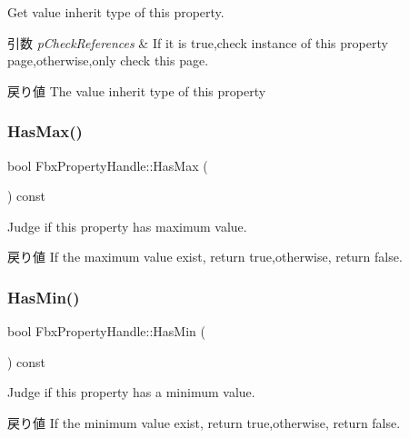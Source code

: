 Get value inherit type of this property. 
\begin{DoxyParams}{引数}
{\em p\+Check\+References} & If it is true,check instance of this property page,otherwise,only check this page. \\
\hline
\end{DoxyParams}
\begin{DoxyReturn}{戻り値}
The value inherit type of this property 
\end{DoxyReturn}
\mbox{\label{class_fbx_property_handle_ac14373e76b24b0b6ba5d99f9fef10a5f}} 
\subsubsection{\texorpdfstring{Has\+Max()}{HasMax()}}
{\footnotesize\ttfamily bool Fbx\+Property\+Handle\+::\+Has\+Max (\begin{DoxyParamCaption}{ }\end{DoxyParamCaption}) const}

Judge if this property has maximum value. \begin{DoxyReturn}{戻り値}
If the maximum value exist, return true,otherwise, return false. 
\end{DoxyReturn}
\mbox{\label{class_fbx_property_handle_a08cf85e6eda102f161bcb3c578e6c17b}} 
\subsubsection{\texorpdfstring{Has\+Min()}{HasMin()}}
{\footnotesize\ttfamily bool Fbx\+Property\+Handle\+::\+Has\+Min (\begin{DoxyParamCaption}{ }\end{DoxyParamCaption}) const}

Judge if this property has a minimum value. \begin{DoxyReturn}{戻り値}
If the minimum value exist, return true,otherwise, return false. 
\end{DoxyReturn}
\mbox{\label{class_fbx_property_handle_ad89e57bd3b7cfe2758d8b95f252b8b9f}} 
